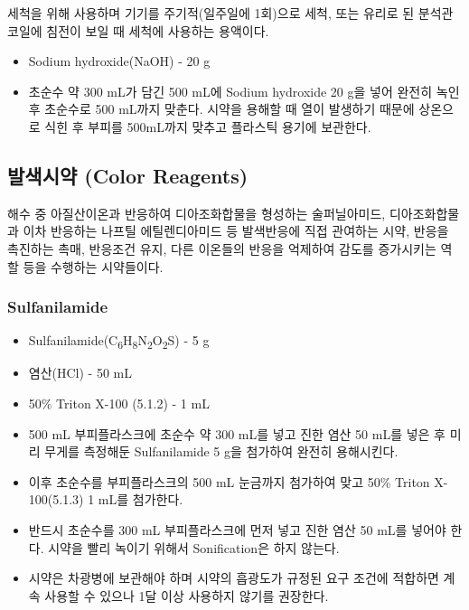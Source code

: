 \documentclass[
]{book}
\providecommand{\tightlist}{%
  \setlength{\itemsep}{0pt}\setlength{\parskip}{0pt}}
\begin{document}
세척을 위해 사용하며 기기를 주기적(일주일에 1회)으로 세척, 또는 유리로 된 분석관 코일에 침전이 보일 때 세척에 사용하는 용액이다.

\begin{itemize}
\tightlist
\item
  Sodium hydroxide(NaOH) - 20 g
\item
  초순수 약 300 mL가 담긴 500 mL에 Sodium hydroxide 20 g을 넣어 완전히 녹인 후 초순수로 500 mL까지 맞춘다. 시약을 용해할 때 열이 발생하기 때문에 상온으로 식힌 후 부피를 500mL까지 맞추고 플라스틱 용기에 보관한다.
\end{itemize}

\hypertarget{uxbc1cuxc0c9uxc2dcuxc57d-color-reagents}{%
\subsection{발색시약 (Color Reagents)}\label{uxbc1cuxc0c9uxc2dcuxc57d-color-reagents}}

해수 중 아질산이온과 반응하여 디아조화합물을 형성하는 술퍼닐아미드, 디아조화합물과 이차 반응하는 나프틸 에틸렌디아미드 등 발색반응에 직접 관여하는 시약, 반응을 촉진하는 촉매, 반응조건 유지, 다른 이온들의 반응을 억제하여 감도를 증가시키는 역할 등을 수행하는 시약들이다.

\hypertarget{sulfanilamide}{%
\subsubsection{Sulfanilamide}\label{sulfanilamide}}

\begin{itemize}
\tightlist
\item
  Sulfanilamide(C\textsubscript{6}H\textsubscript{8}N\textsubscript{2}O\textsubscript{2}S) - 5 g\\
\item
  염산(HCl) - 50 mL
\item
  50\% Triton X-100 (5.1.2) - 1 mL
\item
  500 mL 부피플라스크에 초순수 약 300 mL를 넣고 진한 염산 50 mL를 넣은 후 미리 무게를 측정해둔 Sulfanilamide 5 g을 첨가하여 완전히 용해시킨다.\\
\item
  이후 초순수를 부피플라스크의 500 mL 눈금까지 첨가하여 맞고 50\% Triton X-100(5.1.3) 1 mL를 첨가한다.
\item
  반드시 초순수를 300 mL 부피플라스크에 먼저 넣고 진한 염산 50 mL를 넣어야 한다. 시약을 빨리 녹이기 위해서 Sonification은 하지 않는다.
\item
  시약은 차광병에 보관해야 하며 시약의 흡광도가 규정된 요구 조건에 적합하면 계속 사용할 수 있으나 1달 이상 사용하지 않기를 권장한다.
\end{itemize}
\end{document}
